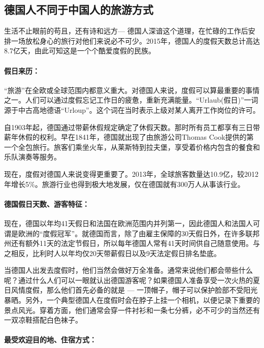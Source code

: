 \subsection{德国人不同于中国人的旅游方式}

生活不止眼前的苟且，还有诗和远方--- 德国人深谙这个道理，在忙碌的工作后安排一场放松身心的旅行对他们来说必不可少。2015年，德国人的度假天数总计高达8.7亿天，由此可知这是一个个酷爱度假的民族。

\paragraph{假日来历：}

“旅游”在全欧或全球范围内都意义重大。对德国人来说，度假可以算最重要的事情之一。人们可以通过度假忘记工作日的疲惫，重新充满能量。“Urlaub(假日)”一词源于中古高地德语“Urloup”。这个词在当时表示上级对某人离开工作岗位的许可。

自1903年起，德国通过带薪休假规定确定了休假天数。那时所有员工都享有三日带薪年休假的权利。早在1841年，德国就出现了由旅游公司Thomas Cook提供的第一个全包旅行。旅客们乘坐火车，从莱斯特到拉夫堡，享受着价格内包含的餐食和乐队演奏等服务。

现在，度假对德国人来说变得更重要了。2013年，全球旅客数量达10.9亿，较2012年增长5\%。旅游行业也得到极大地发展，仅在德国就有300万人从事该行业。



\paragraph{德国假日天数、游客特征：}

现在，德国以年均41天假日和法国在欧洲范围内并列第一，因此德国人和法国人可谓是欧洲的“度假冠军”。就德国而言，除了由雇主保障的30天假日外，在许多联邦州还有额外11天的法定节假日，所以每年德国人常有41天时间供自己随意使用。与之相反，比利时人以年均仅20天带薪假日以及9天法定假日排名垫底。

当德国人出发去度假时，他们当然会做好万全准备。通常来说他们都会带些什么呢？通过什么人们可以一眼就认出德国游客呢？如果德国人准备享受一次火热的夏日风情度假，那么他们首先必备的就是 --- 一顶帽子，帽子可以保护脸部不受阳光暴晒。另外，一个典型德国人在度假时会在脖子上挂一个相机，以便记录下重要的景点风光。穿着方面，他们通常会穿一件衬衫和一条七分裤，必不可少的当然还有一双凉鞋搭配白色袜子。

\paragraph{最受欢迎目的地、住宿方式：}


